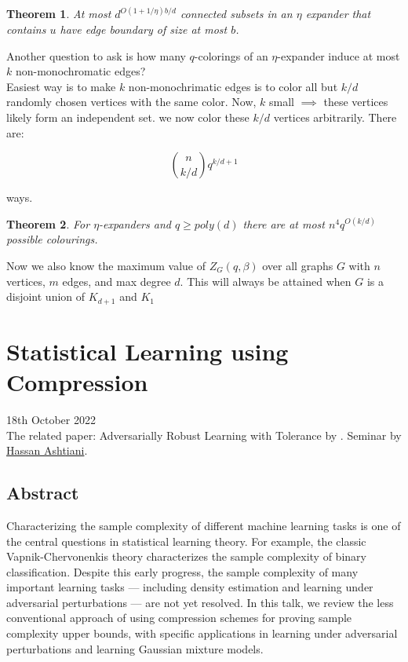 \documentclass{article}
\newtheorem{theorem}{Theorem}
\begin{document}
\begin{theorem}
    At most $d^{O(1+1/\eta)b/d}$ connected subsets in an $\eta$ expander that contains $u$ have edge boundary of size at most $b$.
\end{theorem}

\noindent Another question to ask is how many $q$-colorings of an $\eta$-expander induce at most $k$ non-monochromatic edges?\\

\noindent  Easiest way is to make $k$ non-monochrimatic edges is to color all but $k/d$ randomly chosen vertices with the same color. Now, $k$ small $\implies$ these vertices likely form an independent set. we now color these $k/d$ vertices arbitrarily. There are:

\begin{equation*}
    {n \choose k/d} q^{k/d+1}
\end{equation*}

\noindent ways.

\begin{theorem}
    For $\eta$-expanders and $q \geq poly(d)$ there are at most $n^4 q^{O(k/d)}$ possible colourings.
\end{theorem}

\noindent Now we also know the maximum value of $Z_G(q,\beta)$ over all graphs $G$ with $n$ vertices, $m$ edges, and max degree $d$. This will always be attained when $G$ is a disjoint union of $K_{d+1}$ and $K_1$

\newpage
\section{Statistical Learning using Compression}

18th October 2022\\

\noindent The related paper: Adversarially Robust Learning with Tolerance by \citet{https://doi.org/10.48550/arxiv.2203.00849}. Seminar by \href{https://www.cas.mcmaster.ca/ashtiani/}{Hassan Ashtiani}.

\subsection{Abstract}

\noindent Characterizing the sample complexity of different machine learning tasks is one of the central questions in statistical learning theory. For example, the classic Vapnik-Chervonenkis theory characterizes the sample complexity of binary classification. Despite this early progress, the sample complexity of many important learning tasks — including density estimation and learning under adversarial perturbations — are not yet resolved. In this talk, we review the less conventional approach of using compression schemes for proving sample complexity upper bounds, with specific applications in learning under adversarial perturbations and learning Gaussian mixture models.
\end{document}
